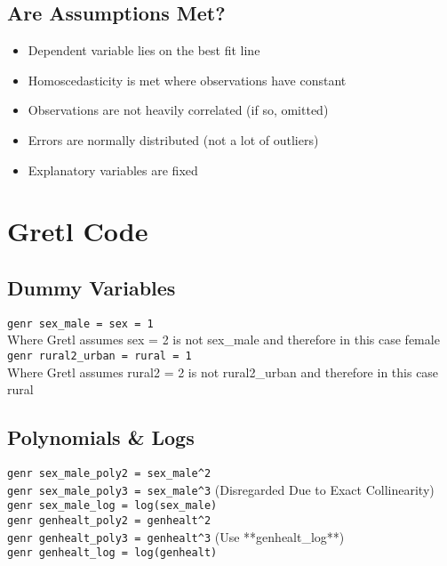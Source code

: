 \documentclass[11pt, english]{article}
\begin{document}
	\newpage
	
	\subsection{Are Assumptions Met?}

	\begin{itemize}
	\setlength\itemsep{0cm}
		\item Dependent variable lies on the best fit line
		\item Homoscedasticity is met where observations have constant
		\item Observations are not heavily correlated (if so, omitted)
		\item Errors are normally distributed (not a lot of outliers)
		\item Explanatory variables are fixed
	\end{itemize}

\newpage

\section{Gretl Code}

	\subsection{Dummy Variables}

	\verb|genr sex_male = sex = 1|\\

	Where Gretl assumes sex = 2 is not sex\_male and therefore in this case female\\

	\verb|genr rural2_urban = rural = 1|\\

	Where Gretl assumes rural2 = 2 is not rural2\_urban and therefore in this case rural

	\subsection{Polynomials \& Logs}

	\verb|genr sex_male_poly2 = sex_male^2|\\
	\verb|genr sex_male_poly3 = sex_male^3| (Disregarded Due to Exact Collinearity)\\
	\verb|genr sex_male_log = log(sex_male)|\\

	\verb|genr genhealt_poly2 = genhealt^2|\\
	\verb|genr genhealt_poly3 = genhealt^3| (Use **genhealt\_log**)\\
	\verb|genr genhealt_log = log(genhealt)|\\
\end{document}
